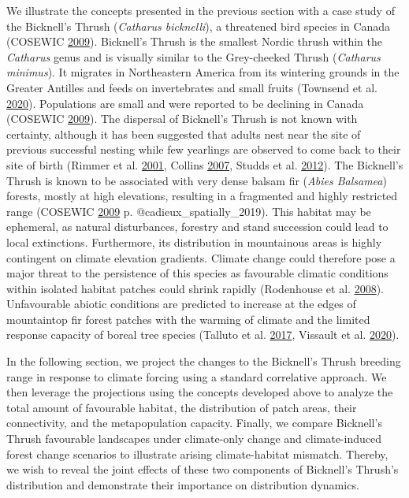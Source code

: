 \documentclass[12pt]{article}
\begin{document}
We illustrate the concepts presented in the previous section with a case
study of the Bicknell's Thrush (\emph{Catharus bicknelli}), a threatened
bird species in Canada (COSEWIC
\protect\hyperlink{ref-cosewic_cosewic_2009}{2009}). Bicknell's Thrush
is the smallest Nordic thrush within the \emph{Catharus} genus and is
visually similar to the Grey-cheeked Thrush (\emph{Catharus minimus}).
It migrates in Northeastern America from its wintering grounds in the
Greater Antilles and feeds on invertebrates and small fruits (Townsend
et al. \protect\hyperlink{ref-billerman_bicknells_2020}{2020}).
Populations are small and were reported to be declining in Canada
(COSEWIC \protect\hyperlink{ref-cosewic_cosewic_2009}{2009}). The
dispersal of Bicknell's Thrush is not known with certainty, although it
has been suggested that adults nest near the site of previous successful
nesting while few yearlings are observed to come back to their site of
birth (Rimmer et al.
\protect\hyperlink{ref-rimmer_bicknells_2001}{2001}, Collins
\protect\hyperlink{ref-collins_spatial_2007}{2007}, Studds et al.
\protect\hyperlink{ref-studds_stable-hydrogen_2012}{2012}). The
Bicknell's Thrush is known to be associated with very dense balsam fir
(\emph{Abies Balsamea}) forests, mostly at high elevations, resulting in
a fragmented and highly restricted range (COSEWIC
\protect\hyperlink{ref-cosewic_cosewic_2009}{2009} p.
@cadieux\_spatially\_2019). This habitat may be ephemeral, as natural
disturbances, forestry and stand succession could lead to local
extinctions. Furthermore, its distribution in mountainous areas is
highly contingent on climate elevation gradients. Climate change could
therefore pose a major threat to the persistence of this species as
favourable climatic conditions within isolated habitat patches could
shrink rapidly (Rodenhouse et al.
\protect\hyperlink{ref-rodenhouse_potential_2008}{2008}). Unfavourable
abiotic conditions are predicted to increase at the edges of mountaintop
fir forest patches with the warming of climate and the limited response
capacity of boreal tree species (Talluto et al.
\protect\hyperlink{ref-talluto_extinction_2017}{2017}, Vissault et al.
\protect\hyperlink{ref-vissault_slow_2020}{2020}).

In the following section, we project the changes to the Bicknell's
Thrush breeding range in response to climate forcing using a standard
correlative approach. We then leverage the projections using the
concepts developed above to analyze the total amount of favourable
habitat, the distribution of patch areas, their connectivity, and the
metapopulation capacity. Finally, we compare Bicknell's Thrush
favourable landscapes under climate-only change and climate-induced
forest change scenarios to illustrate arising climate-habitat mismatch.
Thereby, we wish to reveal the joint effects of these two components of
Bicknell's Thrush's distribution and demonstrate their importance on
distribution dynamics.
\end{document}
